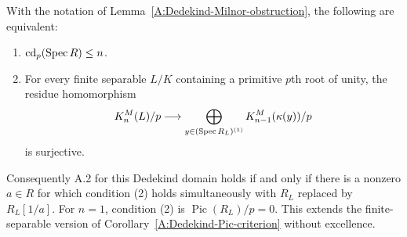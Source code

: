 \begin{theorem}
\label{A:Dedekind-Milnor-criterion}
With the notation of Lemma~\ref{A:Dedekind-Milnor-obstruction},
the following are equivalent:
\begin{enumerate}
\item $\operatorname{cd}_p(\operatorname{Spec} R)\leq n$.
\item For every finite separable $L/K$ containing a primitive
$p$th root of unity, the residue homomorphism
\[
 K_n^M(L)/p\longrightarrow
 \bigoplus_{y\in(\operatorname{Spec} R_L)^{(1)}}K_{n-1}^M(\kappa(y))/p
\]
is surjective.
\end{enumerate}
Consequently A.2 for this Dedekind domain holds if and only if there
is a nonzero $a\in R$ for which condition (2) holds simultaneously
with $R_L$ replaced by $R_L[1/a]$. For $n=1$, condition (2) is
$\operatorname{Pic}(R_L)/p=0$. This extends the finite-separable
version of Corollary~\ref{A:Dedekind-Pic-criterion} without
excellence.
\end{theorem}
